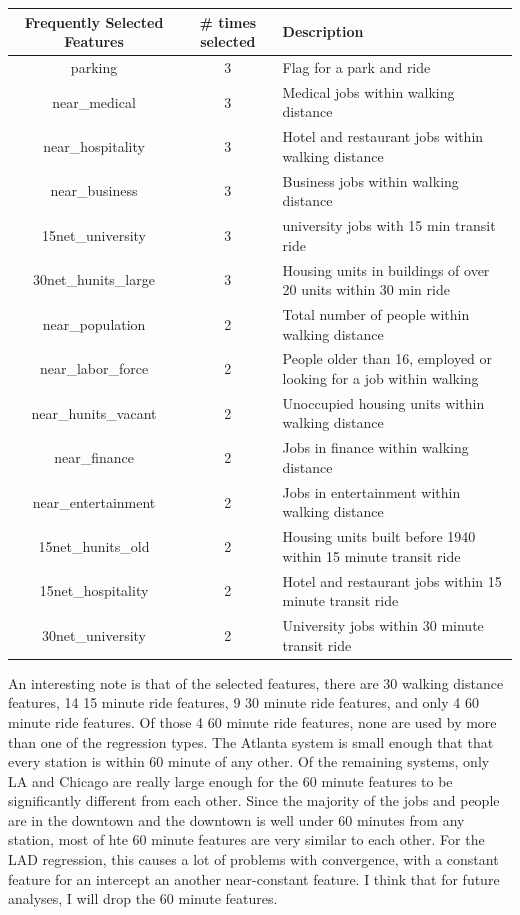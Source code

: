 \documentclass{article}
\begin{document}
\begin{center}
\begin{tabular}{c c l}
\hline
Frequently Selected Features & \# times selected &Description \\
\hline
parking&3&Flag for a park and ride\\
near\_medical&3&Medical jobs within walking distance\\
near\_hospitality&3&Hotel and restaurant jobs within walking distance\\
near\_business&3&Business jobs within walking distance\\
15net\_university&3&university jobs with 15 min transit ride\\
30net\_hunits\_large&3&Housing units in buildings of over 20 units within 30 min ride\\
near\_population&2&Total number of people within walking distance\\
near\_labor\_force&2&People older than 16, employed or looking for a job within walking\\
near\_hunits\_vacant&2&Unoccupied housing units within walking distance\\
near\_finance&2&Jobs in finance within walking distance\\
near\_entertainment&2&Jobs in entertainment within walking distance\\
15net\_hunits\_old&2&Housing units built before 1940 within 15 minute transit ride\\
15net\_hospitality&2&Hotel and restaurant jobs within 15 minute transit ride \\
30net\_university&2&University jobs within 30 minute transit ride\\
\end{tabular}
\end{center}

An interesting note is that of the selected features, there are 30 walking distance features, 14 15 minute ride features, 9 30 minute ride features, and only 4 60 minute ride features. Of those 4 60 minute ride features, none are used by more than one of the regression types. The Atlanta system is small enough that that every station is within 60 minute of any other. Of the remaining systems, only LA and Chicago are really large enough for the 60 minute features to be significantly different from each other. Since the majority of the jobs and people are in the downtown and the downtown is well under 60 minutes from any station, most of hte 60 minute features are very similar to each other. For the LAD regression, this causes a lot of problems with convergence, with a constant feature for an intercept an another near-constant feature. I think that for future analyses, I will drop the 60 minute features. 
\end{document}
